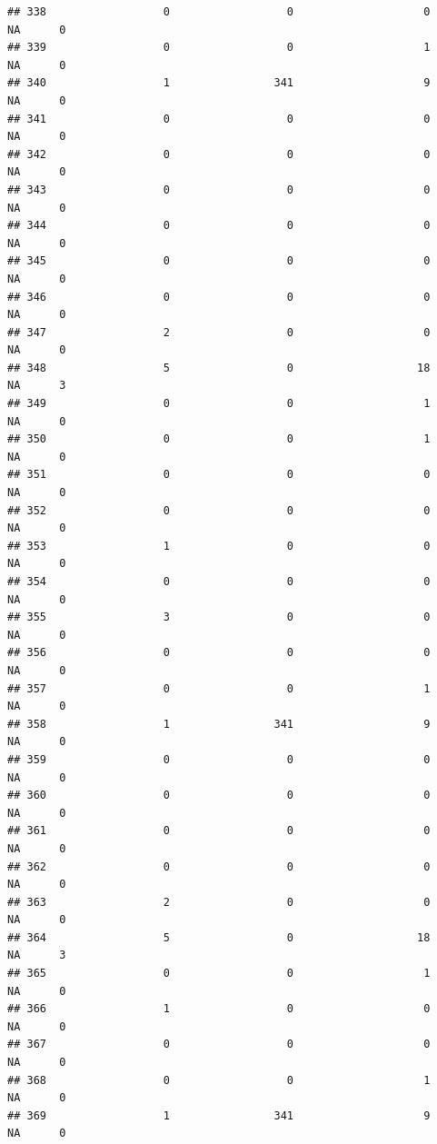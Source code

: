 \documentclass[
]{article}
\begin{document}
\begin{verbatim}
## 338                  0                  0                    0       NA      0
## 339                  0                  0                    1       NA      0
## 340                  1                341                    9       NA      0
## 341                  0                  0                    0       NA      0
## 342                  0                  0                    0       NA      0
## 343                  0                  0                    0       NA      0
## 344                  0                  0                    0       NA      0
## 345                  0                  0                    0       NA      0
## 346                  0                  0                    0       NA      0
## 347                  2                  0                    0       NA      0
## 348                  5                  0                   18       NA      3
## 349                  0                  0                    1       NA      0
## 350                  0                  0                    1       NA      0
## 351                  0                  0                    0       NA      0
## 352                  0                  0                    0       NA      0
## 353                  1                  0                    0       NA      0
## 354                  0                  0                    0       NA      0
## 355                  3                  0                    0       NA      0
## 356                  0                  0                    0       NA      0
## 357                  0                  0                    1       NA      0
## 358                  1                341                    9       NA      0
## 359                  0                  0                    0       NA      0
## 360                  0                  0                    0       NA      0
## 361                  0                  0                    0       NA      0
## 362                  0                  0                    0       NA      0
## 363                  2                  0                    0       NA      0
## 364                  5                  0                   18       NA      3
## 365                  0                  0                    1       NA      0
## 366                  1                  0                    0       NA      0
## 367                  0                  0                    0       NA      0
## 368                  0                  0                    1       NA      0
## 369                  1                341                    9       NA      0

\end{verbatim}
\end{document}
